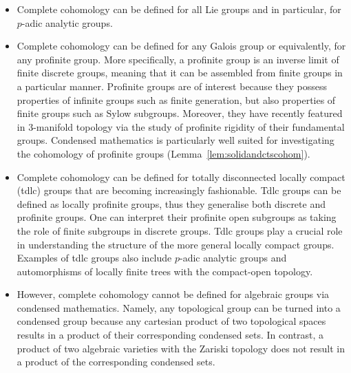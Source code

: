 \documentclass[12pt,a4paper]{article}
\numberwithin{equation}{section}
\theoremstyle{nonumberplain}
\begin{document}
\begin{itemize}
\item Complete cohomology can be defined for all Lie groups and in particular, for $p$-adic analytic groups.
\item Complete cohomology can be defined for any Galois group or equivalently, for any profinite group. More specifically, a profinite group is an inverse limit of finite discrete groups, meaning that it can be assembled from finite groups in a particular manner. Profinite groups are of interest because they possess properties of infinite groups such as finite generation, but also properties of finite groups such as Sylow subgroups. Moreover, they have recently featured in $3$-manifold topology via the study of profinite rigidity of their fundamental groups. Condensed mathematics is particularly well suited for investigating the cohomology of profinite groups (Lemma~\ref{lem:solidandctscohom}).
\item Complete cohomology can be defined for totally disconnected locally compact (tdlc) groups that are becoming increasingly fashionable. Tdlc groups can be defined as locally profinite groups, thus they generalise both discrete and profinite groups. One can interpret their profinite open subgroups as taking the role of finite subgroups in discrete groups. Tdlc groups play a crucial role in understanding the structure of the more general locally compact groups. Examples of tdlc groups also include $p$-adic analytic groups and automorphisms of locally finite trees with the compact-open topology.
\item However, complete cohomology cannot be defined for algebraic groups via condensed mathematics. Namely, any topological group can be turned into a condensed group because any cartesian product of two topological spaces results in a product of their corresponding condensed sets. In contrast, a product of two algebraic varieties with the Zariski topology does not result in a product of the corresponding condensed sets.
\end{itemize}
\end{document}
